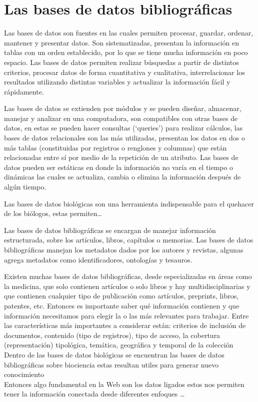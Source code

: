 \section{Las bases de datos bibliográficas}
\noindent
Las bases de datos son fuentes en las cuales permiten procesar, guardar, ordenar, mantener y presentar datos. Son sistematizadas, presentan la información en tablas con un orden establecido, por lo que se tiene mucha información en poco espacio. Las bases de datos permiten realizar búsquedas a partir de distintos criterios, procesar datos de forma cuantitativa y cualitativa, interrelacionar los resultados utilizando distintas variables y actualizar la información fácil y rápidamente.

\smallskip
Las bases de datos se extienden por módulos y se pueden diseñar, almacenar, manejar y analizar en una computadora, son compatibles con otras bases de datos, en estas se pueden hacer consultas (‘queries’) para realizar cálculos, las bases de datos relacionales son las más utilizadas, presentan los datos en dos o más tablas (constituidas por registros o renglones y columnas) que están relacionadas entre sí por medio de la repetición de un atributo.
Las bases de datos pueden ser estáticas en donde la información no varía en el tiempo o dinámicas las cuales se actualiza, cambia o elimina la información después de algún tiempo. 

\smallskip
Las bases de datos biológicas son una herramienta indispensable para el quehacer de los biólogos, estas permiten… 

\smallskip
Las bases de datos bibliográficas se encargan de manejar información estructurada, sobre los artículos, libros, capítulos o memorias. Las bases de datos bibliográficas manejan los metadatos dados por los autores y revistas, algunas agrega metadatos como identificadores, ontologías y tesauros.  

\smallskip
Existen muchas bases de datos bibliográficas, desde especializadas en áreas como la medicina, que solo contienen artículos o solo libros y hay multidisciplinarias y que contienen cualquier tipo de publicación como artículos, preprints, libros, patentes, etc. Entonces es importante saber qué información contienen y que información necesitamos para elegir la o las más relevantes para trabajar. Entre las características más importantes a considerar están: criterios de inclusión de documentos, contenido (tipo de registros), tipo de acceso, la cobertura (representación) tipológica, temática, geográfica y temporal de la colección
Dentro de las bases de datos biológicas se encuentran las bases de datos bibliográficas sobre biociencia estas resultan utiles para generar nuevo conocimiento\\
Entonces algo fundamental en la Web son los datos ligados estos nos permiten tener la información conectada desde diferentes enfoques … 

